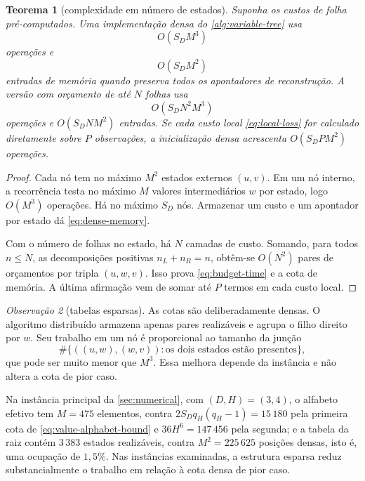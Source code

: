 \documentclass[11pt,a4paper]{article}
\newtheorem{theorem}{Teorema}[section]
\theoremstyle{definition}
\theoremstyle{remark}
\newtheorem{remark}[theorem]{Observação}
\begin{document}
\begin{theorem}[complexidade em número de estados]
\label{thm:state-complexity}
Suponha os custos de folha pré-computados. Uma implementação densa do
\cref{alg:variable-tree} usa
\begin{equation}
 O(S_DM^3)
 \label{eq:dense-time}
\end{equation}
operações e
\begin{equation}
 O(S_DM^2)
 \label{eq:dense-memory}
\end{equation}
entradas de memória quando preserva todos os apontadores de reconstrução.
A versão com orçamento de até $N$ folhas usa
\begin{equation}
 O(S_DN^2M^3)
 \label{eq:budget-time}
\end{equation}
operações e $O(S_DNM^2)$ entradas. Se cada custo local
\eqref{eq:local-loss} for calculado diretamente sobre $P$ observações, a
inicialização densa acrescenta $O(S_DPM^2)$ operações.
\end{theorem}

\begin{proof}
Cada nó tem no máximo $M^2$ estados externos $(u,v)$. Em um nó interno, a
recorrência testa no máximo $M$ valores intermediários $w$ por estado, logo
$O(M^3)$ operações. Há no máximo $S_D$ nós. Armazenar um custo e um apontador
por estado dá \eqref{eq:dense-memory}.

Com o número de folhas no estado, há $N$ camadas de custo. Somando, para todos
$n\le N$, as decomposições positivas $n_L+n_R=n$, obtêm-se $O(N^2)$ pares de
orçamentos por tripla $(u,w,v)$. Isso prova \eqref{eq:budget-time} e a cota de
memória. A última afirmação vem de somar até $P$ termos em cada custo local.
\end{proof}

\begin{remark}[tabelas esparsas]
\label{rem:sparse}
As cotas são deliberadamente densas. O algoritmo distribuído armazena apenas
pares realizáveis e agrupa o filho direito por $w$. Seu trabalho em um nó é
proporcional ao tamanho da junção
\[
 \#\{((u,w),(w,v)):\text{os dois estados estão presentes}\},
\]
que pode ser muito menor que $M^3$. Essa melhora depende da instância e não
altera a cota de pior caso.

Na instância principal da \cref{sec:numerical}, com
$(D,H)=(3,4)$, o alfabeto efetivo tem $M=475$ elementos, contra
$2S_Dq_H(q_H-1)=15\,180$ pela primeira cota de
\eqref{eq:value-alphabet-bound} e $36H^6=147\,456$ pela segunda; e a tabela da
raiz contém $3\,383$ estados realizáveis, contra $M^2=225\,625$ posições
densas, isto é, uma ocupação de $1{,}5\%$. Nas instâncias examinadas, a
estrutura esparsa reduz substancialmente o trabalho em relação à cota densa de
pior caso.
\end{remark}
\end{document}
